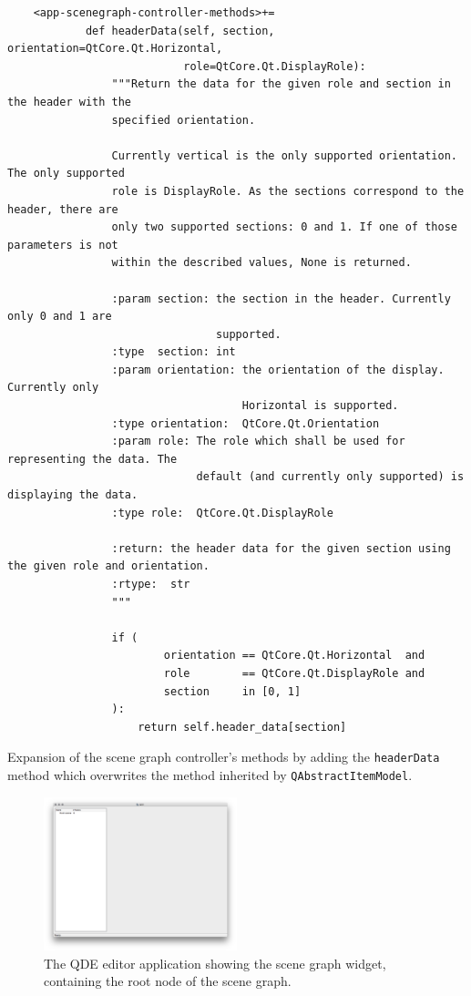 \documentclass[10pt, openright, notitlepage]{scrreprt}
\begin{document}
\begin{listing}[H]
\begin{verbatim}
    <app-scenegraph-controller-methods>+=
            def headerData(self, section, orientation=QtCore.Qt.Horizontal,
                           role=QtCore.Qt.DisplayRole):
                """Return the data for the given role and section in the header with the
                specified orientation.
            
                Currently vertical is the only supported orientation. The only supported
                role is DisplayRole. As the sections correspond to the header, there are
                only two supported sections: 0 and 1. If one of those parameters is not
                within the described values, None is returned.
            
                :param section: the section in the header. Currently only 0 and 1 are
                                supported.
                :type  section: int
                :param orientation: the orientation of the display. Currently only
                                    Horizontal is supported.
                :type orientation:  QtCore.Qt.Orientation
                :param role: The role which shall be used for representing the data. The
                             default (and currently only supported) is displaying the data.
                :type role:  QtCore.Qt.DisplayRole
            
                :return: the header data for the given section using the given role and orientation.
                :rtype:  str
                """
            
                if (
                        orientation == QtCore.Qt.Horizontal  and
                        role        == QtCore.Qt.DisplayRole and
                        section     in [0, 1]
                ):
                    return self.header_data[section]
\end{verbatim}
\caption{\label{lst:app-scenegraph-controller-methods-header-data}
Expansion of the scene graph controller's methods by adding the \texttt{headerData} method which overwrites the method inherited by \texttt{QAbstractItemModel}.}
\end{listing}

\begin{figure}[H]
\centering
\includegraphics[width=0.5\textwidth]{./images/qde_alpha_03.png}
\caption{\label{fig:editor-alpha-03}
The QDE editor application showing the scene graph widget, containing the root node of the scene graph.}
\end{figure}
\end{document}

